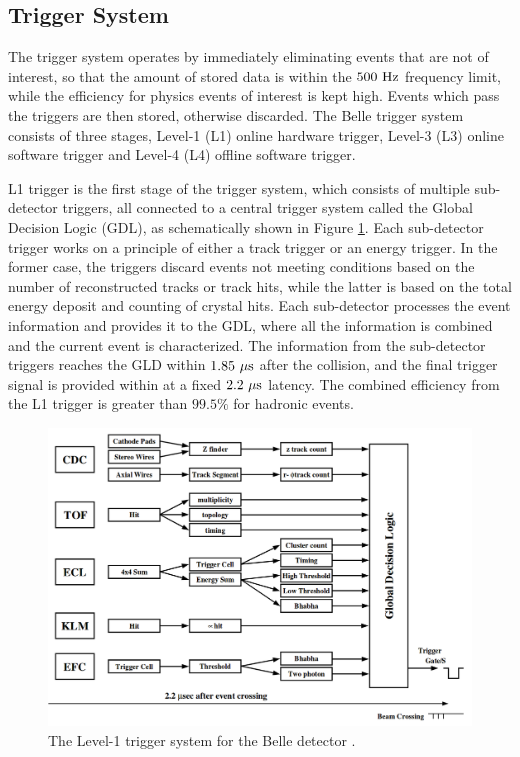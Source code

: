 \subsection{Trigger System}
The trigger system operates by immediately eliminating events that are not of interest, so that the amount of stored data is within the $500\mathrm{~Hz}$ frequency limit, while the efficiency for physics events of interest is kept high. Events which pass the triggers are then stored, otherwise discarded. The Belle trigger system consists of three stages, Level-1 (L1) online hardware trigger, Level-3 (L3) online software trigger and Level-4 (L4) offline software trigger.

L1 trigger is the first stage of the trigger system, which consists of multiple sub-detector triggers, all connected to a central trigger system called the Global Decision Logic (GDL), as schematically shown in Figure \ref{fig:TRG_GDL}. Each sub-detector trigger works on a principle of either a track trigger or an energy trigger. In the former case, the triggers discard events not meeting conditions based on the number of reconstructed tracks or track hits, while the latter is based on the total energy deposit and counting of crystal hits. Each sub-detector processes the event information and provides it to the GDL, where all the information is combined and the current event is characterized. The information from the sub-detector triggers reaches the GLD within $1.85\mathrm{~\mu s}$ after the collision, and the final trigger signal is provided within at a fixed $2.2\mathrm{~\mu s}$ latency. The combined efficiency from the L1 trigger is greater than $99.5\%$ for hadronic events.

\begin{figure}[H]
	\centering
	\captionsetup{width=0.8\linewidth}
	\includegraphics[width=0.8\linewidth]{fig/setup/TRG_GDL}
	\caption{The Level-1 trigger system for the Belle detector \cite{ABASHIAN2002117}.}
	\label{fig:TRG_GDL}
\end{figure}

